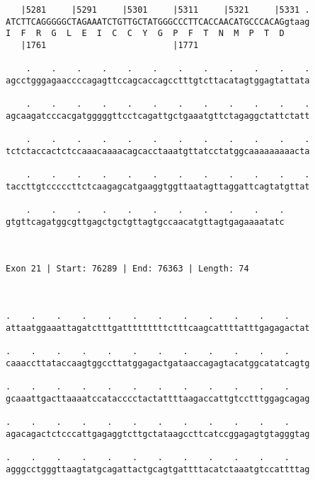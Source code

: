 \documentclass{article}
\begin{document}
\begin{Verbatim}
   |5281     |5291     |5301     |5311     |5321     |5331 .
ATCTTCAGGGGGCTAGAAATCTGTTGCTATGGGCCCTTCACCAACATGCCCACAGgtaag
I  F  R  G  L  E  I  C  C  Y  G  P  F  T  N  M  P  T  D     
   |1761                         |1771                      
  
    .    .    .    .    .    .    .    .    .    .    .    .
agcctgggagaaccccagagttccagcaccagcctttgtcttacatagtggagtattata
                                                            
    .    .    .    .    .    .    .    .    .    .    .    .
agcaagatcccacgatgggggttcctcagattgctgaaatgttctagaggctattctatt
                                                            
    .    .    .    .    .    .    .    .    .    .    .    .
tctctaccactctccaaacaaaacagcacctaaatgttatcctatggcaaaaaaaaacta
                                                            
    .    .    .    .    .    .    .    .    .    .    .    .
taccttgtcccccttctcaagagcatgaaggtggttaatagttaggattcagtatgttat
                                                            
    .    .    .    .    .    .    .    .    .    .    .
gtgttcagatggcgttgagctgctgttagtgccaacatgttagtgagaaaatatc
                                                       
                                                       
 
Exon 21 | Start: 76289 | End: 76363 | Length: 74



.    .    .    .    .    .    .    .    .    .    .    .    
attaatggaaattagatctttgatttttttttctttcaagcattttatttgagagactat
                                                            
.    .    .    .    .    .    .    .    .    .    .    .    
caaaccttataccaagtggccttatggagactgataaccagagtacatggcatatcagtg
                                                            
.    .    .    .    .    .    .    .    .    .    .    .    
gcaaattgacttaaaatccatacccctactattttaagaccattgtcctttggagcagag
                                                            
.    .    .    .    .    .    .    .    .    .    .    .    
agacagactctcccattgagaggtcttgctataagccttcatccggagagtgtagggtag
                                                            
.    .    .    .    .    .    .    .    .    .    .    .    
agggcctgggttaagtatgcagattactgcagtgattttacatctaaatgtccattttag
                                                            

\end{Verbatim}
\end{document}

